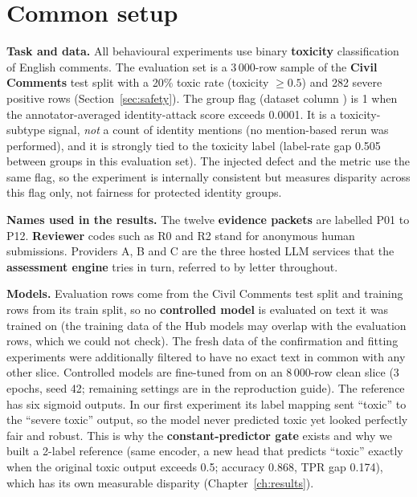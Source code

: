 \section{Common setup}\label{sec:setup}
\textbf{Task and data.} All behavioural experiments use binary \textbf{toxicity} classification of English comments. The evaluation set is a 3\,000-row sample of the \textbf{Civil Comments} test split \cite{borkan2019} with a 20\% toxic rate (toxicity $\ge0.5$) and 282 severe positive rows (Section~\ref{sec:safety}). The group flag (dataset column ) is 1 when the annotator-averaged identity-attack score exceeds 0.0001. It is a toxicity-subtype signal, \emph{not} a count of identity mentions (no mention-based rerun was performed), and it is strongly tied to the toxicity label (label-rate gap 0.505 between groups in this evaluation set). The injected defect and the metric use the same flag, so the experiment is internally consistent but measures disparity across this flag only, not fairness for protected identity groups.

\textbf{Names used in the results.} The twelve \textbf{evidence packets} are labelled P01 to P12. \textbf{Reviewer} codes such as R0 and R2 stand for anonymous human submissions. Providers A, B and C are the three hosted LLM services that the \textbf{assessment engine} tries in turn, referred to by letter throughout.

\textbf{Models.} Evaluation rows come from the Civil Comments test split and training rows from its train split, so no \textbf{controlled model} is evaluated on text it was trained on (the training data of the Hub models may overlap with the evaluation rows, which we could not check). The fresh data of the confirmation and fitting experiments were additionally filtered to have no exact text in common with any other slice. Controlled models are fine-tuned from  \cite{devlin2019} on an 8\,000-row clean slice (3 epochs, seed 42; remaining settings are in the reproduction guide). The reference  has six sigmoid outputs. In our first experiment its label mapping sent ``toxic'' to the ``severe toxic'' output, so the model never predicted toxic yet looked perfectly fair and robust. This is why the \textbf{constant-predictor gate} exists and why we built a 2-label reference (same encoder, a new head that predicts ``toxic'' exactly when the original toxic output exceeds 0.5; accuracy 0.868, TPR gap 0.174), which has its own measurable disparity (Chapter~\ref{ch:results}).


